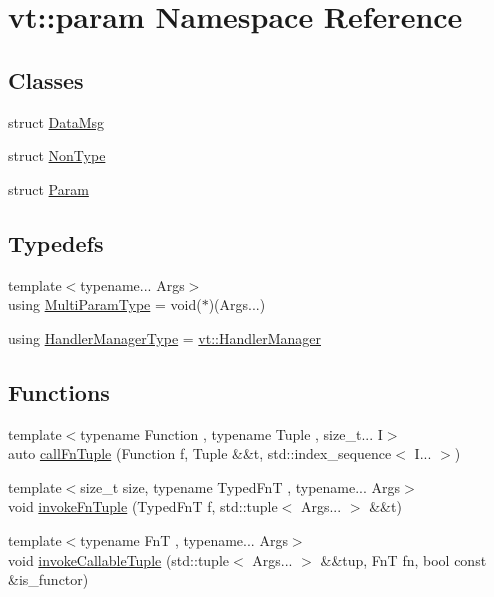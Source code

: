 \hypertarget{namespacevt_1_1param}{}\section{vt\+:\+:param Namespace Reference}
\label{namespacevt_1_1param}
\subsection*{Classes}
\begin{DoxyCompactItemize}
\item 
struct \hyperlink{structvt_1_1param_1_1_data_msg}{Data\+Msg}
\item 
struct \hyperlink{structvt_1_1param_1_1_non_type}{Non\+Type}
\item 
struct \hyperlink{structvt_1_1param_1_1_param}{Param}
\end{DoxyCompactItemize}
\subsection*{Typedefs}
\begin{DoxyCompactItemize}
\item 
{\footnotesize template$<$typename... Args$>$ }\\using \hyperlink{namespacevt_1_1param_ada9e92f75ab7e859947a8ffe5bae6c5b}{Multi\+Param\+Type} = void($\ast$)(Args...)
\item 
using \hyperlink{namespacevt_1_1param_ad9561687e11201a35ed8aba0b666c0b4}{Handler\+Manager\+Type} = \hyperlink{structvt_1_1_handler_manager}{vt\+::\+Handler\+Manager}
\end{DoxyCompactItemize}
\subsection*{Functions}
\begin{DoxyCompactItemize}
\item 
{\footnotesize template$<$typename Function , typename Tuple , size\+\_\+t... I$>$ }\\auto \hyperlink{namespacevt_1_1param_a776cb4d76cdd0199f02e22708d9e893c}{call\+Fn\+Tuple} (Function f, Tuple \&\&t, std\+::index\+\_\+sequence$<$ I... $>$)
\item 
{\footnotesize template$<$size\+\_\+t size, typename Typed\+FnT , typename... Args$>$ }\\void \hyperlink{namespacevt_1_1param_a568981462cb51bb976f0a07945611b0b}{invoke\+Fn\+Tuple} (Typed\+FnT f, std\+::tuple$<$ Args... $>$ \&\&t)
\item 
{\footnotesize template$<$typename FnT , typename... Args$>$ }\\void \hyperlink{namespacevt_1_1param_abf08d95b32c6ee59c63fd63d77a71bae}{invoke\+Callable\+Tuple} (std\+::tuple$<$ Args... $>$ \&\&tup, FnT fn, bool const \&is\+\_\+functor)
\end{DoxyCompactItemize}


